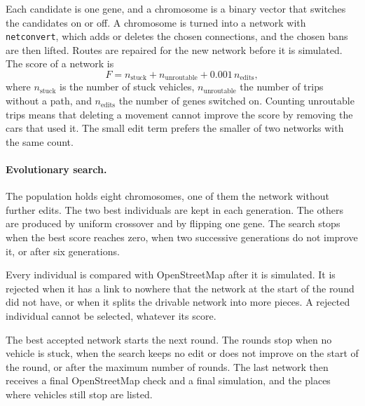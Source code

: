 Each candidate is one gene, and a chromosome is a binary vector that
switches the candidates on or off. A chromosome is turned into a
network with \texttt{netconvert}, which adds or deletes the chosen
connections, and the chosen bans are then lifted. Routes are repaired
for the new network before it is simulated. The score of a network is
\begin{equation}
    F = n_{\mathrm{stuck}} + n_{\mathrm{unroutable}} + 0.001\,n_{\mathrm{edits}},
    \label{eq:repair-fitness}
\end{equation}
where \(n_{\mathrm{stuck}}\) is the number of stuck vehicles,
\(n_{\mathrm{unroutable}}\) the number of trips without a path, and
\(n_{\mathrm{edits}}\) the number of genes switched on. Counting
unroutable trips means that deleting a movement cannot improve the
score by removing the cars that used it. The small edit term prefers
the smaller of two networks with the same count.

\paragraph{Evolutionary search.} The population holds eight
chromosomes, one of them the network without further edits. The two
best individuals are kept in each generation. The others are produced
by uniform crossover and by flipping one gene. The search stops when
the best score reaches zero, when two successive generations do not
improve it, or after six generations.

Every individual is compared with OpenStreetMap after it is simulated.
It is rejected when it has a link to nowhere that the network at the
start of the round did not have, or when it splits the drivable network
into more pieces. A rejected individual cannot be selected, whatever
its score.

The best accepted network starts the next round. The rounds stop when
no vehicle is stuck, when the search keeps no edit or does not improve
on the start of the round, or after the maximum number of rounds. The
last network then receives a final OpenStreetMap check and a final
simulation, and the places where vehicles still stop are listed.

